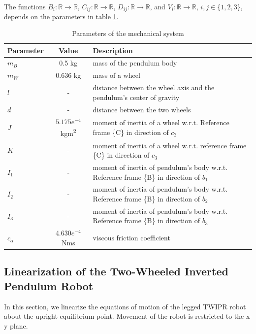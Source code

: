 The functions $B_i: \mathbb{R} \rightarrow \mathbb{R}$, $C_{ij}: \mathbb{R} \rightarrow \mathbb{R}$, $D_{ij}: \mathbb{R} \rightarrow \mathbb{R}$, and $V_i: \mathbb{R} \rightarrow \mathbb{R}$, $i,j \in \{1,2,3\}$, depends on the parameters in table \ref{tab:parameters}.
	\begin{table}[h]
		\centering
		\caption{Parameters of the mechanical system}
		\label{tab:parameters}
		\begin{tabular}{lcl}
			\toprule
			Parameter & Value & Description \\
			\midrule
			$m_B$ & 0.5 kg & mass of the pendulum body \\
			$m_W$ & 0.636 kg & mass of a wheel \\
			$l$ & - & distance between the wheel axis and the pendulum's center of gravity \\
			$d$ & - & distance between the two wheels \\
			$J$ & \(5.175 e^{-4}\) kgm\textsuperscript{2} & moment of inertia of a wheel w.r.t. Reference frame \{C\} in direction of \(c_2\) \\
			$K$ & - & moment of inertia of a wheel w.r.t. reference frame \{C\} in direction of \(c_3\) \\
			$I_1$ & - & moment of inertia of pendulum's body w.r.t. Reference frame \{B\} in direction of \(b_1\) \\
			$I_2$ & - & moment of inertia of pendulum's body w.r.t. Reference frame \{B\} in direction of \(b_2\) \\
			$I_3$ & - & moment of inertia of pendulum's body w.r.t. Reference frame \{B\} in direction of \(b_3\) \\
			$c_\alpha$ & \(4.630 e^{-4}\) Nms & viscous friction coefficient \\
			\bottomrule
		\end{tabular}
	\end{table}
	
	
\newpage
\subsection{Linearization of the Two-Wheeled Inverted Pendulum Robot}
In this section, we linearize the equations of motion of the legged TWIPR robot about the upright equilibrium point. Movement of the robot is restricted to the x-y plane.

